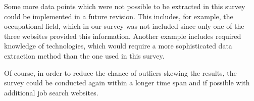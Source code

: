 \documentclass[runningheads]{llncs}
\begin{document}
Some more data points which were not possible to be extracted in this survey could be implemented in a future revision. This includes, for example, the occupational field, which in our survey was not included since only one of the three websites provided this information. Another example includes required knowledge of technologies, which would require a more sophisticated data extraction method than the one used in this survey.

Of course, in order to reduce the chance of outliers skewing the results, the survey could be conducted again within a longer time span and if possible with additional job search websites.

\newpage
\printbibliography
\end{document}
